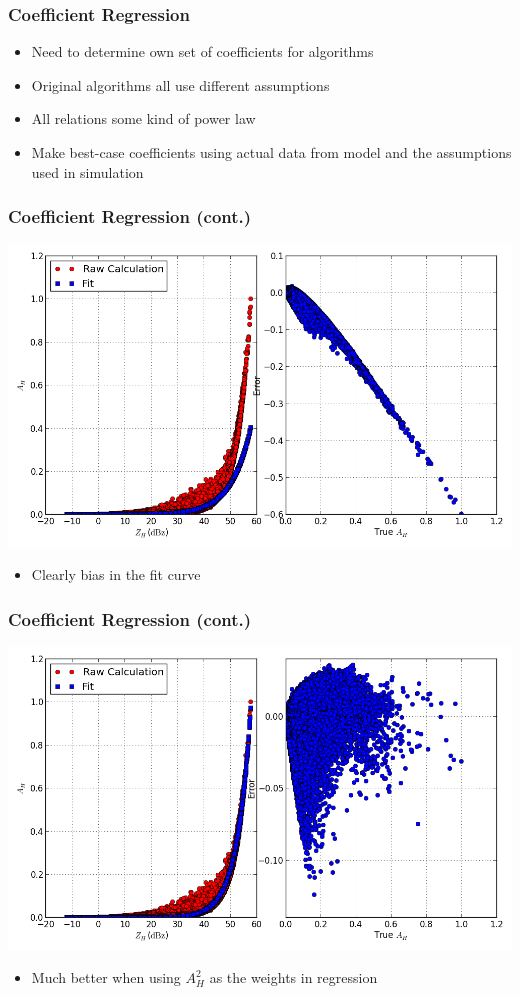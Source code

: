 \documentclass[red]{beamer}
\begin{document}
\begin{frame}
	\frametitle{Coefficient Regression}
	\begin{itemize}
		\item Need to determine own set of coefficients for algorithms
		\item Original algorithms all use different assumptions
		\item All relations some kind of power law
		\item Make best-case coefficients using actual data from model and
		the assumptions used in simulation
	\end{itemize}
\end{frame}

\begin{frame}
	\frametitle{Coefficient Regression (cont.)}
	\begin{center}
		\includegraphics[scale=0.35]{figures/basic_power_law.png}
	\end{center}
	\begin{itemize}
		\item Clearly bias in the fit curve
	\end{itemize}
\end{frame}

\begin{frame}
	\frametitle{Coefficient Regression (cont.)}
	\begin{center}
		\includegraphics[scale=0.35]{figures/weighted_power_law.png}
	\end{center}
	\begin{itemize}
		\item Much better when using $A_H^2$ as the weights in regression
	\end{itemize}
\end{frame}
\end{document}
